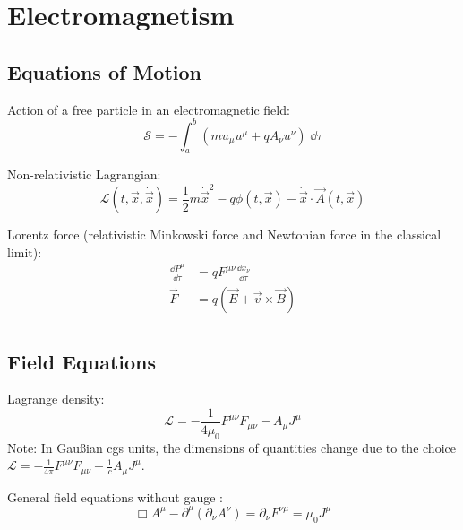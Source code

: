 \section{Electromagnetism}
	\subsection{Equations of Motion}
		\noindent
		Action of a free particle in an electromagnetic field:
		\begin{equation}
			\mathcal{S}= -\int_{a}^{b}\left(m u_\mu u^\mu + q A_\nu u^\nu\right)\;\dd\tau
		\end{equation}

		\noindent
		Non-relativistic Lagrangian:
		\begin{equation}
			\mathcal{L}(t,\vec{x},\dot{\vec{x}}) = \frac{1}{2}m\dot{\vec{x}}^2 - q\phi(t,\vec{x}) - \dot{\vec{x}}\cdot\vec{A}(t,\vec{x})
		\end{equation}

		\noindent
		Lorentz force (relativistic Minkowski force and Newtonian force in the classical limit):
		\begin{equation}
			\begin{aligned}
				\frac{\dd P^\mu}{\dd \tau} &= q F^{\mu\nu}\frac{\dd x_\nu}{\dd \tau} \\
				\vec{F} &= q\left(\vec{E}+\vec{v}\times\vec{B}\right) \\
			\end{aligned}
		\end{equation}

	\subsection{Field Equations}
		\noindent
		Lagrange density:
		\begin{equation}
			\mathcal{L} = -\frac{1}{4\mu_0}F^{\mu\nu} F_{\mu\nu} - A_\mu J^\mu
		\end{equation}
		Note: In Gaußian cgs units, the dimensions of quantities change due to the choice $\mathcal{L} = -\frac{1}{4\pi}F^{\mu\nu} F_{\mu\nu} - \frac{1}{c}A_\mu J^\mu$.

		General field equations without gauge :
		\begin{equation}
			\Box A^\mu-\partial^\mu\left(\partial_\nu A^\nu\right) = \partial_\nu F^{\nu\mu} =  \mu_0 J^\mu
		\end{equation}

